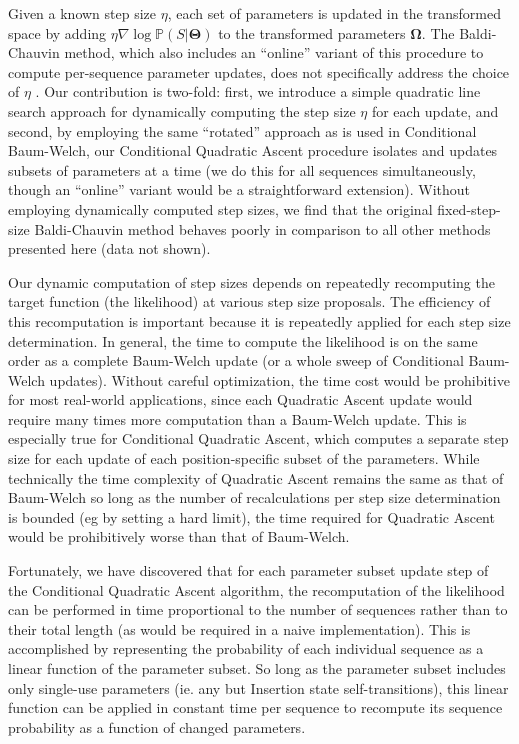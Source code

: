 \documentclass[preprint,12pt,authoryear]{elsarticle}
\newcommand{\Sequences}{\ensuremath{S}}
\newcommand{\Parameters}{\ensuremath{\bm{\Theta}}}
\newcommand{\BoltzmannTransformedParameters}{\ensuremath{\bm{\Omega}}}
\newcommand{\qaStepSize}{\ensuremath{\eta}}
\newcommand{\Prob}{\ensuremath{\mathbb P}}
\begin{document}
Given a known step size $\qaStepSize$, each set of parameters is
updated in the transformed space by adding $\qaStepSize \nabla \log
\Prob ( \Sequences \big| \Parameters )$ to the transformed parameters
$\BoltzmannTransformedParameters$.  The Baldi-Chauvin method, which
also includes an ``online'' variant of this procedure to compute
per-sequence parameter updates, does not specifically address the
choice of $\qaStepSize$ \citep{baldi1994smooth}.  Our contribution is two-fold: first, we
introduce a simple quadratic line search approach for dynamically
computing the step size $\qaStepSize$ for each update, and second, by
employing the same ``rotated'' approach as is used in Conditional
Baum-Welch, our Conditional Quadratic Ascent procedure isolates and
updates subsets of parameters at a time (we do this for all sequences
simultaneously, though an ``online'' variant would be a
straightforward extension).  Without employing dynamically computed step sizes,
we find that the original fixed-step-size Baldi-Chauvin method behaves poorly in
comparison to all other methods presented here (data not shown).

Our dynamic computation of step sizes depends on repeatedly
recomputing the target function (the likelihood) at various step size
proposals.  The efficiency of this recomputation is important because
it is repeatedly applied for each step size determination.  In
general, the time to compute the likelihood is on the same order as a
complete Baum-Welch update (or a whole sweep of Conditional Baum-Welch
updates).  Without careful optimization, the time cost would be
prohibitive for most real-world applications, since each Quadratic
Ascent update would require many times more computation than a
Baum-Welch update.  This is especially true for Conditional Quadratic
Ascent, which computes a separate step size for each update of each
position-specific subset of the parameters.  While technically the
time complexity of Quadratic Ascent remains the same as that of
Baum-Welch so long as the number of recalculations per step size
determination is bounded (eg by setting a hard limit), the time
required for Quadratic Ascent would be prohibitively worse than that
of Baum-Welch.

Fortunately, we have discovered that for each parameter subset update
step of the Conditional Quadratic Ascent algorithm, the recomputation
of the likelihood can be performed in time proportional to the number
of sequences rather than to their total length (as would be required in a
naive implementation).  This is accomplished by representing the
probability of each individual sequence as a linear function of the
parameter subset.  So long as the parameter subset includes only
single-use parameters (ie. any but Insertion state
self-transitions), this linear function can be applied in constant
time per sequence to recompute its sequence probability as a function
of changed parameters.
\end{document}
